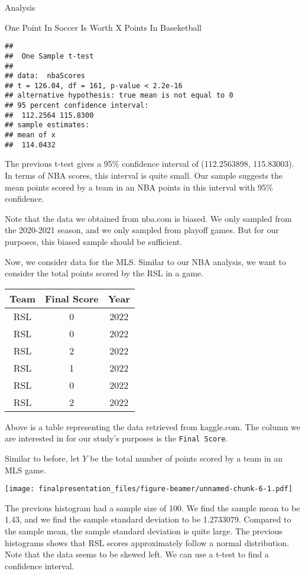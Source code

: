 \documentclass[
  ignorenonframetext,
]{beamer}
\begin{document}
\begin{frame}[fragile]{Analysis}
\begin{block}{One Point In Soccer Is Worth X Points In Baseketball}
\begin{verbatim}
## 
##  One Sample t-test
## 
## data:  nbaScores
## t = 126.04, df = 161, p-value < 2.2e-16
## alternative hypothesis: true mean is not equal to 0
## 95 percent confidence interval:
##  112.2564 115.8300
## sample estimates:
## mean of x 
##  114.0432
\end{verbatim}

The previous t-test gives a 95\% confidence interval of (112.2563898,
115.83003). In terms of NBA scores, this interval is quite small. Our
sample suggests the mean points scored by a team in an NBA points in
this interval with 95\% confidence.

Note that the data we obtained from nba.com is biased. We only sampled
from the 2020-2021 season, and we only sampled from playoff games. But
for our purposes, this biased sample should be sufficient.

Now, we consider data for the MLS. Similar to our NBA analysis, we want
to consider the total points scored by the RSL in a game.

\begin{table}
\centering
\begin{tabular}{c|c|c}
\hline
Team & Final Score & Year\\
\hline
RSL & 0 & 2022\\
\hline
RSL & 0 & 2022\\
\hline
RSL & 2 & 2022\\
\hline
RSL & 1 & 2022\\
\hline
RSL & 0 & 2022\\
\hline
RSL & 2 & 2022\\
\hline
\end{tabular}
\end{table}

Above is a table representing the data retrieved from kaggle.com. The
column we are interested in for our study's purposes is the
\texttt{Final\ Score}.

Similar to before, let \(Y\) be the total number of points scored by a
team in an MLS game.

\texttt{[image: finalpresentation\_files/figure-beamer/unnamed-chunk-6-1.pdf]}

The previous histogram had a sample size of 100. We find the sample mean
to be 1.43, and we find the sample standard deviation to be 1.2733079.
Compared to the sample mean, the sample standard deviation is quite
large. The previous histograms shows that RSL scores approximately
follow a normal distribution. Note that the data seems to be skewed
left. We can use a t-test to find a confidence interval.


\end{block}
\end{frame}
\end{document}
